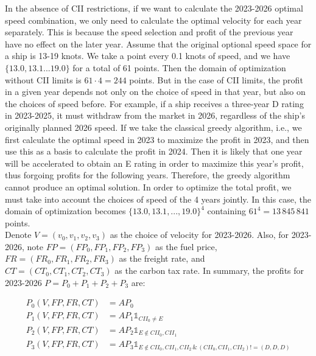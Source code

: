 \documentclass[a4paper,12pt]{article}
\begin{document}
In the absence of CII restrictions, if we want to calculate the 2023-2026 optimal speed combination, we only need to calculate the optimal velocity for each year separately.
This is because the speed selection and profit of the previous year have no effect on the later year.
Assume that the original optional speed space for a ship is 13-19 knots.
We take a point every 0.1 knots of speed, and we have $\{13.0, 13.1 ... 19.0\}$ for a total of 61 points.
Then the domain of optimization without CII limits is $61 \cdot 4 = 244$ points.
But in the case of CII limits, the profit in a given year depends not only on the choice of speed in that year, but also on the choices of speed before.
For example, if a ship receives a three-year D rating in 2023-2025, it must withdraw from the market in 2026, regardless of the ship's originally planned 2026 speed.
If we take the classical greedy algorithm, i.e., we first calculate the optimal speed in 2023 to maximize the profit in 2023, and then use this as a basis to calculate the profit in 2024.
Then it is likely that one year will be accelerated to obtain an E rating in order to maximize this year's profit, thus forgoing profits for the following years.
Therefore, the greedy algorithm cannot produce an optimal solution.
In order to optimize the total profit, we must take into account the choices of speed of the 4 years jointly.
In this case, the domain of optimization becomes $\{13.0, 13.1, ..., 19.0\}^4$ containing $61^4 = 13 \,845 \,841$ points.\\



Denote $V = (v_0, v_1, v_2, v_3)$ as the choice of velocity for 2023-2026.
Also, for 2023-2026, note $FP=(FP_0, FP_1,FP_2,FP_3)$ as the fuel price, $FR=(FR_0,FR_1,FR_2,FR_3)$ as the freight rate, and $CT=(CT_0, CT_1, CT_2, CT_3)$ as the carbon tax rate.
In summary, the profits for 2023-2026 $P=P_0+P_1+P_2+P_3$ are:

\begin{align}
	\label{eq:P}
	P_0(V, FP, FR, CT ) & = AP_0                                                                                   \\
	P_1(V, FP, FR, CT ) & = AP_1 \mathds{1} _{CII_0 \neq E}                                                        \\
	P_2(V, FP, FR, CT ) & = AP_2 \mathds{1} _{E \notin {CII_0, CII_1}}                                             \\
	P_3(V, FP, FR, CT ) & = AP_3 \mathds{1} _{E \notin {CII_0, CII_1, CII_2}\,\&\, (CII_0, CII_1, CII_2)!=(D,D,D)}
\end{align}
\end{document}
